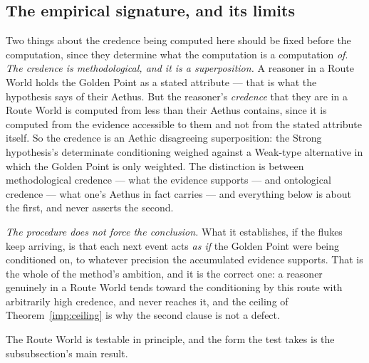 \subsection{The empirical signature, and its limits}\label{gc:sub:credencemethod}

Two things about the credence being computed here should be fixed before
the computation, since they determine what the computation is a
computation \emph{of}. \emph{The credence is methodological, and it is a superposition.} A
reasoner in a Route World holds the Golden Point as a stated attribute
--- that is what the hypothesis says of their Aethus. But the reasoner's
\emph{credence} that they are in a Route World is computed from less
than their Aethus contains, since it is computed from the evidence
accessible to them and not from the stated attribute itself. So the
credence is an Aethic disagreeing superposition: the Strong hypothesis's
determinate conditioning weighed against a Weak-type alternative in which
the Golden Point is only weighted. The distinction is between
methodological credence --- what the evidence supports --- and
ontological credence --- what one's Aethus in fact carries --- and
everything below is about the first, and never asserts the second.

\emph{The procedure does not force the conclusion.} What it establishes,
if the flukes keep arriving, is that each next event acts \emph{as if}
the Golden Point were being conditioned on, to whatever precision the
accumulated evidence supports. That is the whole of the method's
ambition, and it is the correct one: a reasoner genuinely in a Route
World tends toward the conditioning by this route with arbitrarily high
credence, and never reaches it, and the ceiling of
Theorem~\ref{imp:ceiling} is why the second clause is not a defect.

The Route World is testable in
principle, and the form the test takes is the subsubsection's main
result.

